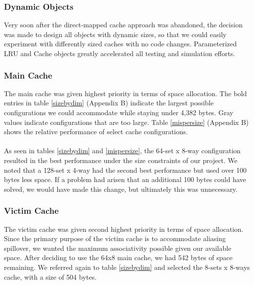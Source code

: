 \documentclass[twocolumn]{article}
\begin{document}
\subsubsection{Dynamic Objects}
Very soon after the direct-mapped cache approach was abandoned, the decision was made to design all objects with dynamic sizes, so that we could easily experiment with differently sized caches with no code changes.  Parameterized LRU and Cache objects greatly accelerated all testing and simulation efforts. 
\subsubsection{Main Cache}
The main cache was given highest priority in terms of space allocation.  The bold entries in table \ref{sizebydim} (Appendix B) indicate the largest possible configurations we could accommodate while staying under 4,382 bytes.  Gray values indicate configurations that are too large.  Table \ref{mispersize} (Appendix B) shows the relative performance  of select cache configurations.\\\\
As seen in tables \ref{sizebydim} and \ref{mispersize}, the 64-set x 8-way configuration resulted in the best performance under the size constraints of our project.  We noted that a 128-set x 4-way had the second best performance but used over 100 bytes less space.  If a problem had arisen that an additional 100 bytes could have solved, we would have made this change, but ultimately this was unnecessary. 
\subsubsection{Victim Cache}
The victim cache was given second highest priority in terms of space allocation.  Since the primary purpose of the victim cache is to accommodate aliasing spillover, we wanted the maximum associativity possible given our available space.   After deciding to use the 64x8 main cache, we had 542 bytes of space remaining.  We referred again to table \ref{sizebydim} and selected the 8-sets x 8-ways cache, with a size of 504 bytes.  
\end{document}
